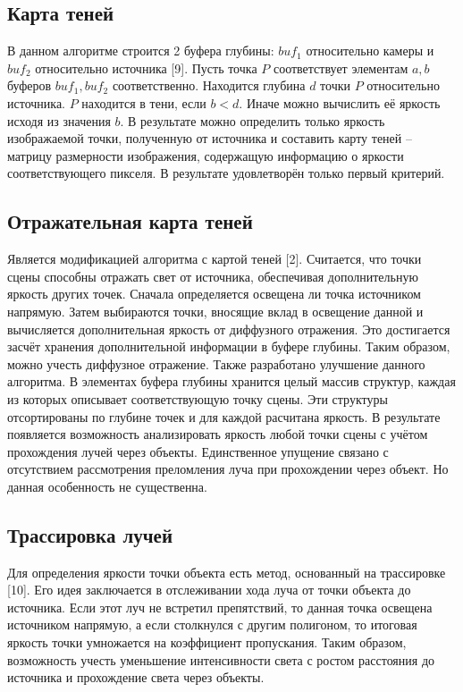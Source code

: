 {    \subsection{Карта теней} {
        В данном алгоритме строится 2 буфера глубины:
        $buf_1$ относительно камеры и $buf_2$ относительно источника [9].
        Пусть точка $P$ соответствует элементам $a, b$
        буферов $buf_1, buf_2$ соответственно.
        Находится глубина $d$ точки $P$ относительно источника.
        $P$ находится в тени, если $b < d$.
        Иначе можно вычислить её яркость исходя из значения $b$.
        В результате можно определить только яркость изображаемой точки, полученную от источника и составить карту теней -- матрицу размерности изображения,
        содержащую информацию о яркости соответствующего пикселя.
        В результате удовлетворён только первый критерий.
    }
    \subsection{Отражательная карта теней} {
        Является модификацией алгоритма с картой теней [2].
        Считается, что точки сцены способны отражать свет от источника, обеспечивая
        дополнительную яркость других точек.
        Сначала определяется освещена ли точка источником напрямую.
        Затем выбираются точки, вносящие вклад в освещение данной и вычисляется
        дополнительная яркость от диффузного отражения.
        Это достигается засчёт хранения дополнительной информации в буфере глубины.
        Таким образом, можно учесть диффузное отражение.
        Также разработано улучшение данного алгоритма.
        В элементах буфера глубины хранится целый массив структур, каждая из которых
        описывает соответствующую точку сцены.
        Эти структуры отсортированы по глубине точек и для каждой расчитана яркость.
        В результате появляется возможность анализировать яркость любой точки сцены
        с учётом прохождения лучей через объекты.
        Единственное упущение связано с отсутствием рассмотрения преломления
        луча при прохождении через объект.
        Но данная особенность не существенна.
    }

    \subsection {Трассировка лучей} {
        Для определения яркости точки объекта есть метод, основанный на
        трассировке [10].
        Его идея заключается в отслеживании хода луча от точки объекта до
        источника.
        Если этот луч не встретил препятствий, то данная точка освещена
        источником напрямую, а если столкнулся с другим полигоном, то итоговая
        яркость точки умножается на коэффициент пропускания.
        Таким образом, возможность учесть уменьшение интенсивности света с
        ростом расстояния до источника и прохождение света через объекты.
    }

}
